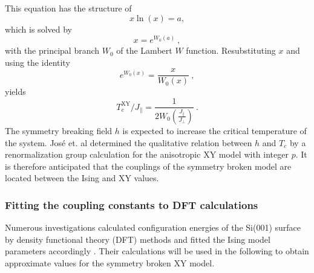 	This equation has the structure of
	\begin{equation}
		x \ln (x) =	a,
	\end{equation}
	which is solved by
	\begin{equation}
		x =	e^{W_0 (a)}~,
	\end{equation}
	with the principal branch $W_0$ of the Lambert $W$ function. Resubstituting $x$ and using the identity
	\begin{equation}
		e^{W_0(x)} =	\frac{x}{W_0(x)} ~,
	\end{equation} 
	yields
	\begin{equation} \label{Eq::XY-crit-general-effective}
		{T^{\text{XY}}_c} /	{J_\parallel} =	\frac{1}{2 W_0 \left(\frac{J_\parallel}{J_\perp}\right)}~.
	\end{equation}
 	The symmetry breaking field $h$ is expected to increase the critical temperature of the system. José et. al \cite{jose1977renormalization} determined the qualitative relation between $h$ and $T_c$ by a renormalization group calculation for the anisotropic XY model with integer $p$. It is therefore anticipated that the couplings of the symmetry broken model are located between the Ising and XY values.
	
	\subsubsection{Fitting the coupling constants to DFT calculations}
	Numerous investigations calculated configuration energies of the Si(001) \cite{fu2001molecular, ramstad1995theoretical} surface by density functional theory (DFT) methods and fitted the Ising model parameters accordingly \cite{pillay2004revisit, inoue1994order, ihm1983structural, xiao2019spontaneous}. Their calculations will be used in the following to obtain approximate values for the symmetry broken XY model.  \\
	
